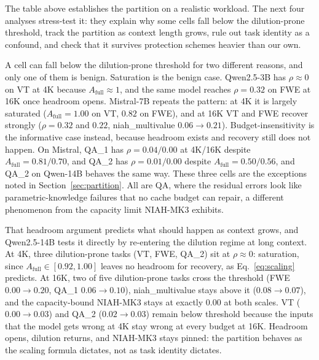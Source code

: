 The table above establishes the partition on a realistic workload. The
next four analyses stress-test it: they explain why some cells fall below
the dilution-prone threshold, track the partition as context length grows,
rule out task identity as a confound, and check that it survives protection
schemes heavier than our own.

A cell can fall below the dilution-prone threshold for two different
reasons, and only one of them is benign. Saturation is the benign case.
Qwen2.5-3B has $\rho \approx 0$ on VT at 4K because $A_{\mathrm{full}}
\approx 1$, and the same model reaches $\rho = 0.32$ on FWE at 16K once
headroom opens. Mistral-7B repeats the pattern: at 4K it is largely
saturated ($A_{\mathrm{full}} = 1.00$ on VT, $0.82$ on FWE), and at 16K VT
and FWE recover strongly ($\rho = 0.32$ and $0.22$, niah\_multivalue
$0.06 \to 0.21$). Budget-insensitivity is the informative case instead,
because headroom exists and recovery still does not happen. On Mistral,
QA\_1 has $\rho = 0.04 / 0.00$ at 4K/16K despite $A_{\mathrm{full}} = 0.81
/ 0.70$, and QA\_2 has $\rho = 0.01 / 0.00$ despite $A_{\mathrm{full}} =
0.50 / 0.56$, and QA\_2 on Qwen-14B behaves the same way. These three
cells are the exceptions noted in Section~\ref{sec:partition}. All are
QA, where the residual errors look like parametric-knowledge failures
that no cache budget can repair, a different phenomenon from the capacity
limit NIAH-MK3 exhibits.

That headroom argument predicts what should happen as context grows, and
Qwen2.5-14B tests it directly by re-entering the dilution regime at long
context. At 4K, three dilution-prone tasks (VT, FWE, QA\_2) sit at $\rho
\approx 0$: saturation, since $A_{\mathrm{full}} \in [0.92, 1.00]$ leaves
no headroom for recovery, as Eq.~\eqref{eq:scaling} predicts. At 16K, two
of five dilution-prone tasks cross the threshold (FWE $0.00 \to 0.20$,
QA\_1 $0.06 \to 0.10$), niah\_multivalue stays above it ($0.08 \to
0.07$), and the capacity-bound NIAH-MK3 stays at exactly $0.00$ at both
scales. VT ($0.00 \to 0.03$) and QA\_2 ($0.02 \to 0.03$) remain below
threshold because the inputs that the model gets wrong at 4K stay wrong
at every budget at 16K. Headroom opens, dilution returns, and NIAH-MK3
stays pinned: the partition behaves as the scaling formula dictates, not
as task identity dictates.

